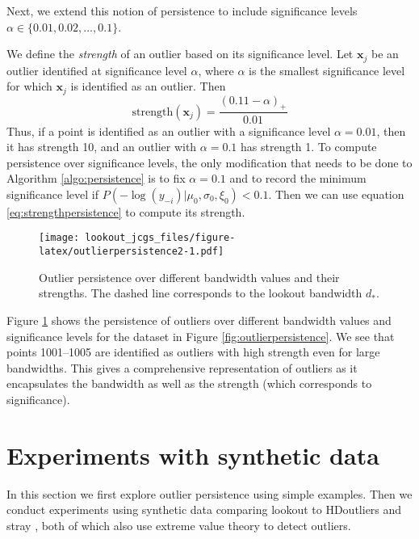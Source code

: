 \documentclass[12pt]{article}
\theoremstyle{definition}
\theoremstyle{definition}
\theoremstyle{definition}
\theoremstyle{remark}
\begin{document}
Next, we extend this notion of persistence to include significance levels \(\alpha \in \{0.01, 0.02, \dots, 0.1 \}\).

We define the \emph{strength} of an outlier based on its significance level. Let \(\bm{x}_j\) be an outlier identified at significance level \(\alpha\), where \(\alpha\) is the smallest significance level for which \(\bm{x}_j\) is identified as an outlier. Then
\begin{equation}\label{eq:strengthpersistence}
    \text{strength} (\bm{x}_j) = \frac{(0.11 - \alpha)_+}{0.01}
\end{equation}
Thus, if a point is identified as an outlier with a significance level \(\alpha = 0.01\), then it has strength 10, and an outlier with \(\alpha = 0.1\) has strength 1. To compute persistence over significance levels, the only modification that needs to be done to Algorithm \ref{algo:persistence} is to fix \(\alpha = 0.1\) and to record the minimum significance level if \(P\left(-\log(y_{-i})|\mu_0, \sigma_0, \xi_0 \right) < 0.1\).
Then we can use equation \eqref{eq:strengthpersistence} to compute its strength.

\begin{figure}
\centering
\texttt{[image: lookout\_jcgs\_files/figure-latex/outlierpersistence2-1.pdf]}
\caption{\label{fig:outlierpersistence2}Outlier persistence over different bandwidth values and their strengths. The dashed line corresponds to the lookout bandwidth \(d_*\).}
\end{figure}

Figure \ref{fig:outlierpersistence2} shows the persistence of outliers over different bandwidth values and significance levels for the dataset in Figure \ref{fig:outlierpersistence}. We see that points 1001--1005 are identified as outliers with high strength even for large bandwidths. This gives a comprehensive representation of outliers as it encapsulates the bandwidth as well as the strength (which corresponds to significance).

\hypertarget{sec:simulations}{%
\section{Experiments with synthetic data}\label{sec:simulations}}

In this section we first explore outlier persistence using simple examples. Then we conduct experiments using synthetic data comparing lookout to HDoutliers \citep{wilkinson2017visualizing} and stray \citep{stray}, both of which also use extreme value theory to detect outliers.
\end{document}
